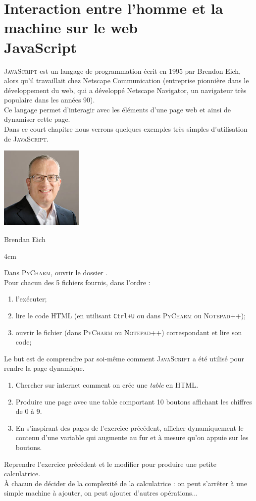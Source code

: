 \documentclass[a4paper,12pt,french]{book}
\begin{document}
\chapter*{\large Interaction entre l'homme et la machine sur le web\\[-1em]\fontsize{35pt}{42pt}\selectfont\titlefont JavaScript}

\double
{
\textsc{JavaScript} est un langage de programmation écrit en 1995 par Brendon Eich, alors qu'il travaillait chez Netscape Communication (entreprise pionnière dans le développement du web, qui a développé Netscape Navigator, un navigateur très populaire dans les années 90).\\
Ce langage permet d'interagir avec les éléments d'une page web et ainsi de dynamiser cette page.\\
Dans ce court chapitre nous verrons quelques exemples très simples d'utilisation de \textsc{JavaScript}.
}
{
	\includegraphics[width=4cm]{img/Brendan_Eich.jpg}
	\begin{center}
		Brendan Eich
	\end{center}
}
{4cm}

\begin{exercice}[]
	Dans \textsc{PyCharm}, ouvrir le dossier .\\
	Pour chacun des 5 fichiers  fournis, dans l'ordre :
	\begin{enumerate}[--]
		\item 	l'exécuter;
		\item 	lire le code  \textsc{HTML} (en utilisant \texttt{Ctrl+U} ou dans \textsc{PyCharm} ou \textsc{Notepad++});
		\item 	ouvrir le fichier   (dans \textsc{PyCharm} ou \textsc{Notepad++}) correspondant et lire son code;
	\end{enumerate}
	Le but est de comprendre par soi-même comment \textsc{JavaScript} a été utilisé pour rendre la page dynamique.
\end{exercice}

\begin{exercice}[]
	\begin{enumerate}[\bfseries 1.]
		\item 	Chercher sur internet comment on crée une \textit{table} en \textsc{HTML}.
		\item 	Produire une page avec une table comportant 10 boutons affichant les chiffres de 0 à 9.
		\item 	En s'inspirant des pages de l'exercice précédent, afficher dynamiquement le contenu d'une variable  qui augmente au fur et à mesure qu'on appuie sur les boutons.
	\end{enumerate}
\end{exercice}

\begin{exercice}[ (facultatif)]
	Reprendre l'exercice précédent et le modifier pour produire une petite calculatrice.\\
	À chacun de décider de la complexité de la calculatrice : on peut s'arrêter à une simple machine à ajouter, on peut ajouter d'autres opérations...
\end{exercice}
\end{document}
